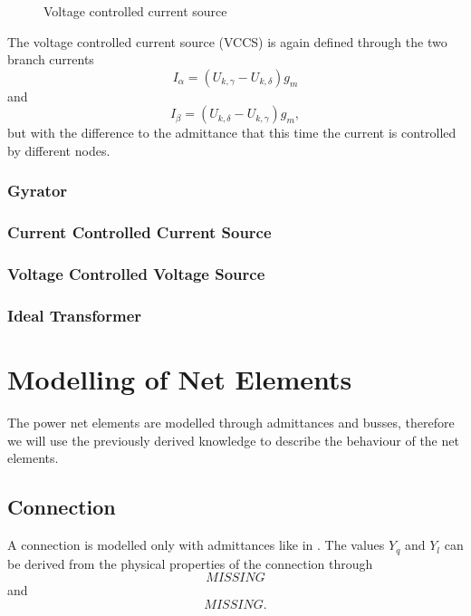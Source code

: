 \begin{figure}
	\centering
	
	\caption{Voltage controlled current source}
	\label{fig:voltage_controlled_current_source}
\end{figure}

The voltage controlled current source (VCCS) is again defined through the two branch currents
\begin{equation}
	I_\alpha = (U_{k,\gamma} - U_{k,\delta}) g_m
\end{equation}
and
\begin{equation}
	I_\beta = (U_{k,\delta} - U_{k,\gamma}) g_m,
\end{equation}
but with the difference to the admittance that this time the current is controlled by different nodes.

\subsubsection{Gyrator}

\subsubsection{Current Controlled Current Source}

\subsubsection{Voltage Controlled Voltage Source}

\subsubsection{Ideal Transformer}

\section{Modelling of Net Elements}

The power net elements are modelled through admittances and busses, therefore we will use the previously derived knowledge to describe the behaviour of the net elements.

\subsection{Connection}
A connection is modelled only with admittances like in . The values $Y_q$ and $Y_l$ can be derived from the physical properties of the connection through
\begin{equation}
	MISSING
\end{equation}
and
\begin{equation}
	MISSING.
\end{equation}

